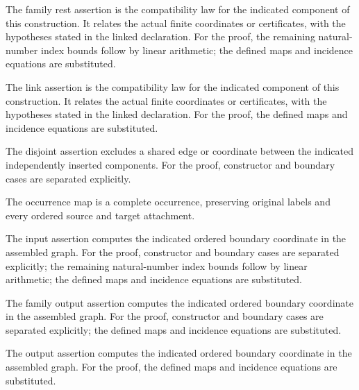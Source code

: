 The family rest assertion is the compatibility law for the indicated component of this construction. It relates the actual finite coordinates or certificates, with the hypotheses stated in the linked declaration.
For the proof, the remaining natural-number index bounds follow by linear arithmetic; the defined maps and incidence equations are substituted.
\par{}

The link assertion is the compatibility law for the indicated component of this construction. It relates the actual finite coordinates or certificates, with the hypotheses stated in the linked declaration.
For the proof, the defined maps and incidence equations are substituted.
\par{}

The disjoint assertion excludes a shared edge or coordinate between the indicated independently inserted components.
For the proof, constructor and boundary cases are separated explicitly.
\par{}

The occurrence map is a complete occurrence, preserving original labels and every ordered source and target attachment.
\par{}

The input assertion computes the indicated ordered boundary coordinate in the assembled graph.
For the proof, constructor and boundary cases are separated explicitly; the remaining natural-number index bounds follow by linear arithmetic; the defined maps and incidence equations are substituted.
\par{}

The family output assertion computes the indicated ordered boundary coordinate in the assembled graph.
For the proof, constructor and boundary cases are separated explicitly; the defined maps and incidence equations are substituted.
\par{}

The output assertion computes the indicated ordered boundary coordinate in the assembled graph.
For the proof, the defined maps and incidence equations are substituted.
\par{}

